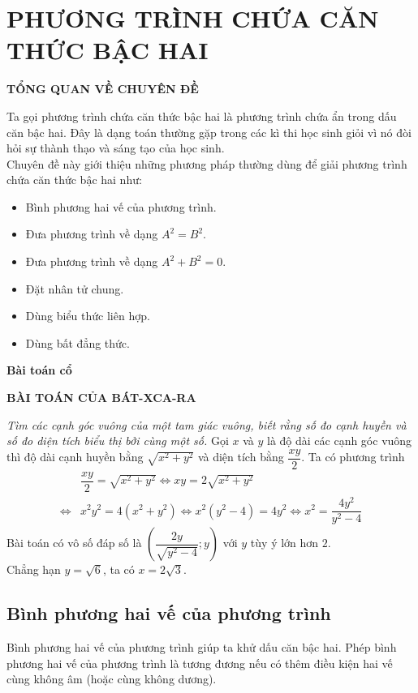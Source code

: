\section{PHƯƠNG TRÌNH CHỨA CĂN THỨC BẬC HAI}

\begin{center}
 \large \textbf{TỔNG QUAN VỀ CHUYÊN ĐỀ}
\end{center}
Ta gọi phương trình chứa căn thức bậc hai là phương trình chứa  ẩn trong dấu căn bậc hai. Đây là dạng toán thường gặp trong các kì thi học sinh giỏi vì nó đòi hỏi sự thành thạo và sáng tạo của học sinh. \\
Chuyên đề này giới thiệu những phương pháp thường  dùng để giải phương trình chứa căn thức bậc hai như:
\begin{itemize}
	\item Bình phương hai vế của phương trình.
	\item Đưa phương trình về dạng $A^2=B^2$.
	\item Đưa phương trình về dạng $A^2+B^2=0$.
	\item Đặt nhân tử chung.
	\item Dùng biểu thức liên hợp.
	\item Dùng bất đẳng thức.
\end{itemize}
\textbf{Bài toán cổ}
\begin{center}
 \large \textbf{BÀI TOÁN CỦA BÁT-XCA-RA}
\end{center}
\textit{Tìm các cạnh góc vuông của một tam giác vuông, biết rằng số đo cạnh huyền và số đo diện tích biểu thị bởi cùng một số.}
\loigiai
{
	Gọi $x$ và $y$ là độ dài các cạnh góc vuông thì độ dài cạnh huyền bằng $\sqrt{x^2+y^2}$ và diện tích bằng $\dfrac{xy}{2}$. Ta có phương trình
	\begin{align*}
		&\dfrac{xy}{2}=\sqrt{x^2+y^2}\Leftrightarrow xy =2\sqrt{x^2+y^2} \\
		\Leftrightarrow &x^2y^2=4(x^2+y^2)\Leftrightarrow  x^2\left(y^2-4\right)=4y^2\Leftrightarrow x^2=\dfrac{4y^2}{y^2-4}
	\end{align*}
Bài toán có vô số đáp số là $\left(\dfrac{2y}{\sqrt{y^2-4}};y\right)$ với $y$ tùy ý lớn hơn $2$.\\
Chẳng hạn $y=\sqrt{6}$, ta có $x=2\sqrt{3}$.
}
\subsection{Bình phương hai vế của phương trình}
Bình phương hai vế của phương trình giúp ta  khử dấu căn bậc hai. Phép bình phương hai vế  của  phương trình là tương đương nếu có thêm điều kiện hai vế cùng không âm (hoặc cùng không dương).

